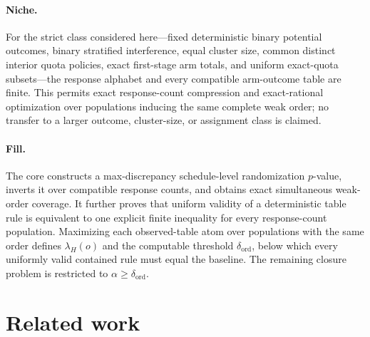 \documentclass{article}
\begin{document}
\paragraph{Niche.} For the strict class considered here—fixed deterministic binary potential outcomes, binary stratified interference, equal cluster size, common distinct interior quota policies, exact first-stage arm totals, and uniform exact-quota subsets—the response alphabet and every compatible arm-outcome table are finite. This permits exact response-count compression and exact-rational optimization over populations inducing the same complete weak order; no transfer to a larger outcome, cluster-size, or assignment class is claimed.

\paragraph{Fill.} The core constructs a max-discrepancy schedule-level randomization \(p\)-value, inverts it over compatible response counts, and obtains exact simultaneous weak-order coverage. It further proves that uniform validity of a deterministic table rule is equivalent to one explicit finite inequality for every response-count population. Maximizing each observed-table atom over populations with the same order defines \(\lambda_H(o)\) and the computable threshold \(\delta_{\mathrm{ord}}\), below which every uniformly valid contained rule must equal the baseline. The remaining closure problem is restricted to \(\alpha\ge\delta_{\mathrm{ord}}\).

\section{Related work}
\end{document}
